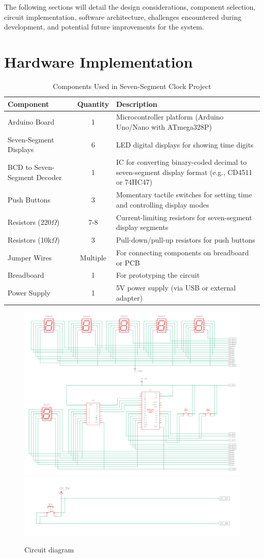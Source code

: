 \documentclass[journal]{IEEEtran}
\begin{document}
The following sections will detail the design considerations, component selection, circuit implementation, software architecture, challenges encountered during development, and potential future improvements for the system.
\section{Hardware Implementation}

\begin{table}[h]
  \centering
  \caption{Components Used in Seven-Segment Clock Project}
  \begin{tabular}{|p{2.5cm}|c|p{7.5cm}|}
  \hline
  \textbf{Component} & \textbf{Quantity} & \textbf{Description} \\
  \hline
  Arduino Board & 1 & Microcontroller platform (Arduino Uno/Nano with ATmega328P) \\
  \hline
  Seven-Segment Displays & 6 & LED digital displays for showing time digits \\
  \hline
  BCD to Seven-Segment Decoder & 1 & IC for converting binary-coded decimal to seven-segment display format (e.g., CD4511 or 74HC47) \\
  \hline
  Push Buttons & 3 & Momentary tactile switches for setting time and controlling display modes \\
  \hline
  Resistors (220$\Omega$) & 7-8 & Current-limiting resistors for seven-segment display segments \\
  \hline
  Resistors (10k$\Omega$) & 3 & Pull-down/pull-up resistors for push buttons \\
  \hline
  Jumper Wires & Multiple & For connecting components on breadboard or PCB \\
  \hline
  Breadboard & 1 & For prototyping the circuit \\
  \hline
  Power Supply & 1 & 5V power supply (via USB or external adapter) \\
  \hline
  \end{tabular}
\end{table}

\begin{figure}[!ht]
    \centering
    \includegraphics[width=0.6\linewidth]{figs/clp1.jpg}
    \includegraphics[width=0.6\linewidth]{figs/clp2.jpg}
    \caption{Circuit diagram}
    \label{fig:circ}
\end{figure}
\end{document}
